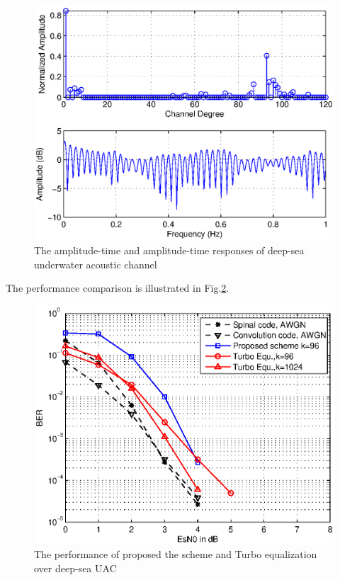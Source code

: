 \documentclass[conference]{IEEEtran}
\begin{document}
\begin{figure}[ht]
\centering
\includegraphics[width=\columnwidth]{DeepChannel.eps}
\caption{The amplitude-time and amplitude-time responses of deep-sea underwater acoustic channel}
\label{fig_DeepChannel}
\end{figure}
The performance comparison is illustrated in Fig.\ref{fig_DeepQPSKComparison}.

\begin{figure}[ht]
\centering
\includegraphics[width=\columnwidth]{DeepQPSKComparison.eps}
\caption{The performance of proposed the scheme and Turbo equalization over deep-sea UAC}
\label{fig_DeepQPSKComparison}
\end{figure}
\end{document}
